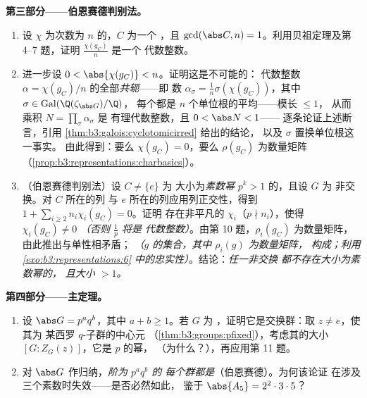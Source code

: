 \begin{problem}
\medskip
\noindent\textbf{第三部分——伯恩赛德判别法。}
\begin{enumerate}[resume]
  \item 设 $\chi$ 为次数为 $n$ 的，$C$ 为一个
        ，且 $\gcd(\abs C, n) = 1$。利用贝祖定理及第
        4--7 题，证明 $\frac{\chi(g_C)}{n}$ 是一个
        代数整数。
  \item 进一步设 $0 < \abs{\chi(g_C)} < n$。证明这是不可能的：
        代数整数 $\alpha =
        \chi(g_C)/n$ 的全部\emph{共轭}——即
        数 $\alpha_\sigma = \frac1n\sigma(\chi(g_C))$，其中
        $\sigma \in \operatorname{Gal}(\Q(\zeta_{\abs G})/\Q)$，
        每个都是 $n$ 个单位根的平均——模长
        $\leq 1$，
        从而乘积 $N = \prod_\sigma\alpha_\sigma$ 是
        有理代数整数，且 $0 < \abs N < 1$——
        逐条论证上述断言，引用
        \cref{thm:b3:galois:cyclotomicirred} 给出的结论，
        以及 $\sigma$ 置换单位根这一事实。
        由此得到：要么 $\chi(g_C) = 0$，要么 $\rho(g_C)$
        为数量矩阵（\cref{prop:b3:representations:charbasics}）。
  \item （伯恩赛德判别法）设 $C \neq \{e\}$ 为
        大小为\emph{素数幂} $p^k > 1$ 的，且设 $G$ 为
        非交换。对 $C$ 所在的列
        与 $e$ 所在的列应用列正交性，得到
        $1 + \sum_{i \geq 2} n_i\chi_i(g_C) = 0$。证明
        存在非平凡的 $\chi_i$（$p \nmid n_i$），使得
        $\chi_i(g_C) \neq 0$ \emph{（否则 $\frac1p$ 将是
        代数整数）}。由第 10 题，$\rho_i(g_C)$
        为数量矩阵，由此推出与单性相矛盾；
        \emph{（$g$ 的集合，其中 $\rho_i(g)$ 为数量矩阵，
        构成；利用
        \cref{exo:b3:representations:6} 中的忠实性）}。结论：\emph{任一非交换
        都不存在大小为素数幂的，
        且大小 $> 1$。}
\end{enumerate}

\medskip
\noindent\textbf{第四部分——主定理。}
\begin{enumerate}[resume]
  \item 设 $\abs G = p^aq^b$，其中 $a + b \geq 1$。若 $G$ 为
        ，证明它是交换群：取 $z \neq e$，使其为
        某西罗 $q$-子群的中心元
        （\cref{thm:b3:groups:pfixed}），考虑其的大小
        $[G : Z_G(z)]$，它是 $p$ 的幂，
        （为什么？），再应用第 11 题。
  \item 对 $\abs G$ 作归纳，\emph{阶为 $p^aq^b$ 的
        每个群都是}（伯恩赛德）。为何该论证
        在涉及三个素数时失效——是否必然如此，
        鉴于 $\abs{A_5} = 2^2\cdot3\cdot5$？
\end{enumerate}


\end{problem}
